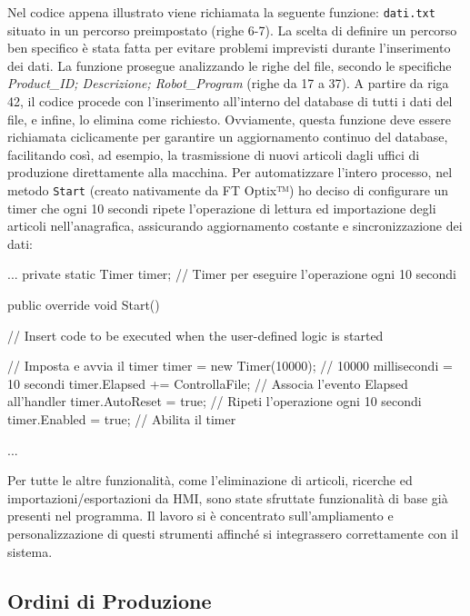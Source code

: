 Nel codice appena illustrato viene richiamata la seguente funzione: \verb|dati.txt| situato in un percorso preimpostato (righe 6-7). La scelta di definire un percorso ben specifico è stata fatta per evitare problemi imprevisti durante l'inserimento dei dati. La funzione prosegue analizzando le righe del file, secondo le specifiche \textit{Product\_ID; Descrizione; Robot\_Program} (righe da 17 a 37). A partire da riga 42, il codice procede con l'inserimento all'interno del database di tutti i dati del file, e infine, lo elimina come richiesto. Ovviamente, questa funzione deve essere richiamata ciclicamente per garantire un aggiornamento continuo del database, facilitando così, ad esempio, la trasmissione di nuovi articoli dagli uffici di produzione direttamente alla macchina. Per automatizzare l'intero processo, nel metodo \verb|Start| (creato nativamente da FT Optix™) ho deciso di configurare un timer che ogni 10 secondi ripete l'operazione di lettura ed importazione degli articoli nell'anagrafica, assicurando aggiornamento costante e sincronizzazione dei dati:
\begin{csharp}
...
    private static Timer timer; // Timer per eseguire l'operazione ogni 10 secondi

    public override void Start()
    {
        // Insert code to be executed when the user-defined logic is started
        
        // Imposta e avvia il timer
        timer = new Timer(10000); // 10000 millisecondi = 10 secondi
        timer.Elapsed += ControllaFile; // Associa l'evento Elapsed all'handler
        timer.AutoReset = true; // Ripeti l'operazione ogni 10 secondi
        timer.Enabled = true; // Abilita il timer
    }
...
\end{csharp}
Per tutte le altre funzionalità, come l'eliminazione di articoli, ricerche ed importazioni/esportazioni da HMI, sono state sfruttate funzionalità di base già presenti nel programma. Il lavoro si è concentrato sull'ampliamento e personalizzazione di questi strumenti affinché si integrassero correttamente con il sistema.

\subsection{Ordini di Produzione}

